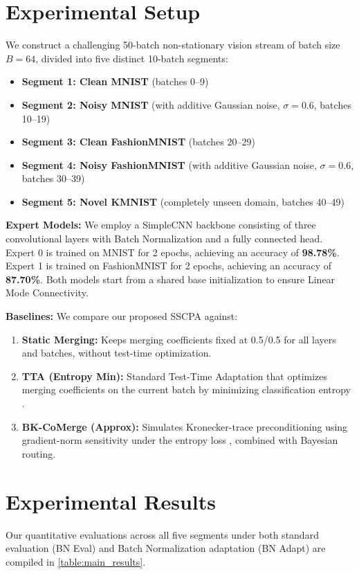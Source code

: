 \documentclass{article}
\theoremstyle{plain}
\theoremstyle{definition}
\theoremstyle{remark}
\begin{document}
\section{Experimental Setup}
\label{sec:experiments}
We construct a challenging 50-batch non-stationary vision stream of batch size $B=64$, divided into five distinct 10-batch segments:
\begin{itemize}
    \item \textbf{Segment 1: Clean MNIST} (batches 0--9)
    \item \textbf{Segment 2: Noisy MNIST} (with additive Gaussian noise, $\sigma = 0.6$, batches 10--19)
    \item \textbf{Segment 3: Clean FashionMNIST} (batches 20--29)
    \item \textbf{Segment 4: Noisy FashionMNIST} (with additive Gaussian noise, $\sigma = 0.6$, batches 30--39)
    \item \textbf{Segment 5: Novel KMNIST} (completely unseen domain, batches 40--49)
\end{itemize}

\textbf{Expert Models:} We employ a SimpleCNN backbone consisting of three convolutional layers with Batch Normalization and a fully connected head. Expert 0 is trained on MNIST for 2 epochs, achieving an accuracy of \textbf{98.78\%}. Expert 1 is trained on FashionMNIST for 2 epochs, achieving an accuracy of \textbf{87.70\%}. Both models start from a shared base initialization to ensure Linear Mode Connectivity.

\textbf{Baselines:} We compare our proposed SSCPA against:
\begin{enumerate}
    \item \textbf{Static Merging:} Keeps merging coefficients fixed at 0.5/0.5 for all layers and batches, without test-time optimization.
    \item \textbf{TTA (Entropy Min):} Standard Test-Time Adaptation that optimizes merging coefficients on the current batch by minimizing classification entropy \cite{wang21}.
    \item \textbf{BK-CoMerge (Approx):} Simulates Kronecker-trace preconditioning using gradient-norm sensitivity under the entropy loss \cite{weimar25}, combined with Bayesian routing.
\end{enumerate}

\section{Experimental Results}
\label{sec:results}
Our quantitative evaluations across all five segments under both standard evaluation (BN Eval) and Batch Normalization adaptation (BN Adapt) are compiled in \cref{table:main_results}.
\end{document}
